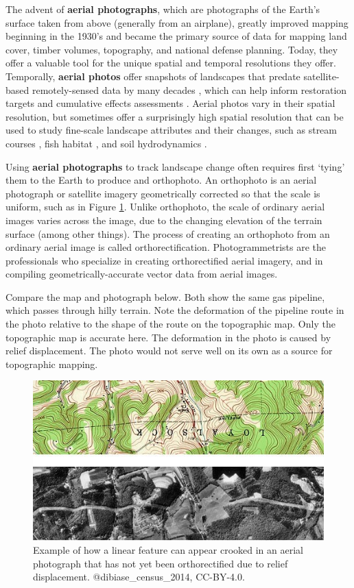 \documentclass[
]{book}
\begin{document}
The advent of \textbf{aerial photographs}, which are photographs of the Earth's surface taken from above (generally from an airplane), greatly improved mapping beginning in the 1930's and became the primary source of data for mapping land cover, timber volumes, topography, and national defense planning. Today, they offer a valuable tool for the unique spatial and temporal resolutions they offer. Temporally, \textbf{aerial photos} offer snapshots of landscapes that predate satellite-based remotely-sensed data by many decades \citep{morgan_historical_2017}, which can help inform restoration targets and cumulative effects assessments \citep{harker_perspectives_2021}. Aerial photos vary in their spatial resolution, but sometimes offer a surprisingly high spatial resolution that can be used to study fine-scale landscape attributes and their changes, such as stream courses \citep{little_channel_2013}, fish habitat \citep{tomlinson_long-term_2011}, and soil hydrodynamics \citep{harker_perspectives_2021}.

Using \textbf{aerial photographs} to track landscape change often requires first `tying' them to the Earth to produce and orthophoto. An orthophoto is an aerial photograph or satellite imagery geometrically corrected so that the scale is uniform, such as in Figure \ref{fig:4-crooked-aerialphoto}. Unlike orthophoto, the scale of ordinary aerial images varies across the image, due to the changing elevation of the terrain surface (among other things). The process of creating an orthophoto from an ordinary aerial image is called orthorectification. Photogrammetrists are the professionals who specialize in creating orthorectified aerial imagery, and in compiling geometrically-accurate vector data from aerial images.

Compare the map and photograph below. Both show the same gas pipeline, which passes through hilly terrain. Note the deformation of the pipeline route in the photo relative to the shape of the route on the topographic map. Only the topographic map is accurate here. The deformation in the photo is caused by relief displacement. The photo would not serve well on its own as a source for topographic mapping.



\begin{figure}
\includegraphics[width=0.75\linewidth]{images/04-crooked-aerialphoto} \caption{Example of how a linear feature can appear crooked in an aerial photograph that has not yet been orthorectified due to relief displacement. @dibiase_census_2014, CC-BY-4.0.}\label{fig:4-crooked-aerialphoto}
\end{figure}
\end{document}
